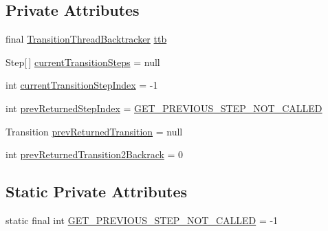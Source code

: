 \subsection*{Private Attributes}
\begin{DoxyCompactItemize}
\item 
final \hyperlink{classgov_1_1nasa_1_1jpf_1_1inspector_1_1server_1_1pathanalysis_1_1_transition_thread_backtracker}{Transition\+Thread\+Backtracker} \hyperlink{classgov_1_1nasa_1_1jpf_1_1inspector_1_1server_1_1pathanalysis_1_1_step_thread_backtracker_af8116b6e623266190a23e9eee2a48c59}{ttb}
\item 
Step\mbox{[}$\,$\mbox{]} \hyperlink{classgov_1_1nasa_1_1jpf_1_1inspector_1_1server_1_1pathanalysis_1_1_step_thread_backtracker_abf3a74be3304a9e6d5effe5093a1c9bd}{current\+Transition\+Steps} = null
\item 
int \hyperlink{classgov_1_1nasa_1_1jpf_1_1inspector_1_1server_1_1pathanalysis_1_1_step_thread_backtracker_a8c36f2ad371b53689fc2cc58b914a6d9}{current\+Transition\+Step\+Index} = -\/1
\item 
int \hyperlink{classgov_1_1nasa_1_1jpf_1_1inspector_1_1server_1_1pathanalysis_1_1_step_thread_backtracker_a3855d3d244e862f96b1745b4a766d8b7}{prev\+Returned\+Step\+Index} = \hyperlink{classgov_1_1nasa_1_1jpf_1_1inspector_1_1server_1_1pathanalysis_1_1_step_thread_backtracker_ad0d409ee2fb3715c00bd99849ea1df6f}{G\+E\+T\+\_\+\+P\+R\+E\+V\+I\+O\+U\+S\+\_\+\+S\+T\+E\+P\+\_\+\+N\+O\+T\+\_\+\+C\+A\+L\+L\+ED}
\item 
Transition \hyperlink{classgov_1_1nasa_1_1jpf_1_1inspector_1_1server_1_1pathanalysis_1_1_step_thread_backtracker_a5dcbd27843c14be6bec9227a05d0a7e1}{prev\+Returned\+Transition} = null
\item 
int \hyperlink{classgov_1_1nasa_1_1jpf_1_1inspector_1_1server_1_1pathanalysis_1_1_step_thread_backtracker_aed03e6fe8f1c61ae04ce170b4a9ce4ff}{prev\+Returned\+Transition2\+Backrack} = 0
\end{DoxyCompactItemize}
\subsection*{Static Private Attributes}
\begin{DoxyCompactItemize}
\item 
static final int \hyperlink{classgov_1_1nasa_1_1jpf_1_1inspector_1_1server_1_1pathanalysis_1_1_step_thread_backtracker_ad0d409ee2fb3715c00bd99849ea1df6f}{G\+E\+T\+\_\+\+P\+R\+E\+V\+I\+O\+U\+S\+\_\+\+S\+T\+E\+P\+\_\+\+N\+O\+T\+\_\+\+C\+A\+L\+L\+ED} = -\/1
\end{DoxyCompactItemize}


